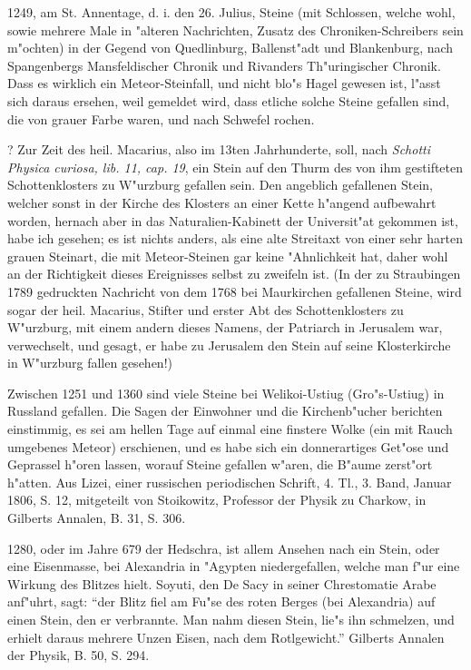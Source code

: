 \documentclass[a4paper, 11pt, oneside, polutonikogreek, german]{article}
\begin{document}
1249, am St. Annentage, d. i. den 26. Julius, Steine (mit Schlossen, welche wohl, sowie mehrere Male in "alteren Nachrichten, Zusatz des Chroniken-Schreibers sein m"ochten) in der Gegend von Quedlinburg, Ballenst"adt und Blankenburg, nach Spangenbergs Mansfeldischer Chronik und Rivanders Th"uringischer Chronik. Dass es wirklich ein Meteor-Steinfall, und nicht blo"s Hagel gewesen ist, l"asst sich daraus ersehen, weil gemeldet wird, dass etliche solche Steine gefallen sind, die von grauer Farbe waren, und nach Schwefel rochen.

? Zur Zeit des heil. Macarius, also im 13ten Jahrhunderte, soll, nach \emph{Schotti Physica curiosa, lib. 11, cap. 19}, ein Stein auf den Thurm des von ihm gestifteten Schottenklosters zu W"urzburg gefallen sein. Den angeblich gefallenen Stein, welcher sonst in der Kirche des Klosters an einer Kette h"angend aufbewahrt worden, hernach aber in das Naturalien-Kabinett der Universit"at gekommen ist, habe ich gesehen; es ist nichts anders, als eine alte Streitaxt von einer sehr harten grauen Steinart, die mit Meteor-Steinen gar keine "Ahnlichkeit hat, daher wohl an der Richtigkeit dieses Ereignisses selbst zu zweifeln ist. (In der zu Straubingen 1789 gedruckten Nachricht von dem 1768 bei Maurkirchen gefallenen Steine, wird sogar der heil. Macarius, Stifter und erster Abt des Schottenklosters zu W"urzburg, mit einem andern dieses Namens, der Patriarch in Jerusalem war, verwechselt, und gesagt, er habe zu Jerusalem den Stein auf seine Klosterkirche in W"urzburg fallen gesehen!)

Zwischen 1251 und 1360 sind viele Steine bei Welikoi-Ustiug (Gro"s-Ustiug) in Russland gefallen. Die Sagen der Einwohner und die Kirchenb"ucher berichten einstimmig, es sei am hellen Tage auf einmal eine finstere Wolke (ein mit Rauch umgebenes Meteor) erschienen, und es habe sich ein donnerartiges Get"ose und Geprassel h"oren lassen, worauf Steine gefallen w"aren, die B"aume zerst"ort h"atten. Aus Lizei, einer russischen periodischen Schrift, 4. Tl., 3. Band, Januar 1806, S. 12, mitgeteilt von Stoikowitz, Professor der Physik zu Charkow, in Gilberts Annalen, B. 31, S. 306.

1280, oder im Jahre 679 der Hedschra, ist allem Ansehen nach ein Stein, oder eine Eisenmasse, bei Alexandria in "Agypten niedergefallen, welche man f"ur eine Wirkung des Blitzes hielt. Soyuti, den De Sacy in seiner Chrestomatie Arabe anf"uhrt, sagt: "`der Blitz fiel am Fu"se des roten Berges (bei Alexandria) auf einen Stein, den er verbrannte. Man nahm diesen Stein, lie"s ihn schmelzen, und erhielt daraus mehrere Unzen Eisen, nach dem Rotlgewicht."' Gilberts Annalen der Physik, B. 50, S. 294.
\end{document}

